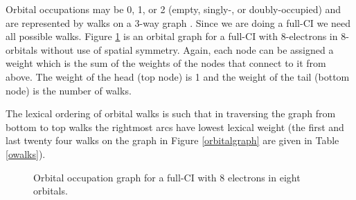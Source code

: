 Orbital occupations may be 0, 1, or 2 (empty, singly-, or
doubly-occupied) and are represented by walks on a 3-way graph
\cite{duchsga,duchfci}.  Since we are doing a full-CI we need all
possible walks.  Figure \ref{ograph} is an orbital graph for a full-CI
with 8-electrons in 8-orbitals without use of spatial symmetry.
Again, each node can be assigned a weight which is the sum of the
weights of the nodes that connect to it from above.  The weight of the
head (top node) is 1 and the weight of the tail (bottom node) is the
number of walks.


The lexical ordering of orbital walks is such that in traversing the
graph from bottom to top walks the rightmost arcs have lowest lexical
weight (the first and last twenty four walks on the graph in Figure
\ref{orbitalgraph} are given in Table \ref{owalks}).

\begin{figure}[htbp]

\center

\centerline{}
\caption{\label{ograph} Orbital occupation graph for a full-CI with 8
electrons in eight orbitals.}
\end{figure}

